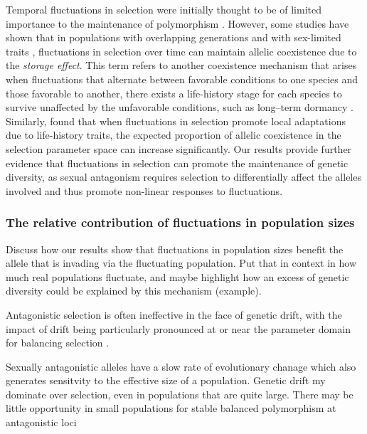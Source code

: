 \documentclass[12pt]{article}
\begin{document}
Temporal fluctuations in selection were initially thought to be of limited importance to the maintenance of polymorphism  \citep{hedrick1974genetic,hedrick1986genetic}. However, some studies have shown that in populations with overlapping generations \citep{ellner1996patterns,sasaki1995evolutionarily} and with sex-limited traits \citep{reinhold2000maintenance}, fluctuations in selection over time can maintain allelic coexistence due to the \textit{storage effect}. This term refers to another coexistence mechanism that arises when fluctuations that alternate between favorable conditions to one species and those favorable to another, there exists a life-history stage for each species to survive unaffected by the unfavorable conditions, such as long--term dormancy \citep{chesson2000general,ellner2016quantify}. Similarly, \citet{connallon2018environmental} found that when fluctuations in selection promote local adaptations due to life-history traits, the expected proportion of allelic coexistence in the selection parameter space can increase significantly. Our results provide further evidence that fluctuations in selection can promote the maintenance of genetic diversity, as sexual antagonism requires selection to differentially affect the alleles involved and thus promote non-linear responses to fluctuations.

\subsubsection*{The relative contribution of fluctuations in population sizes}

Discuss how our results show that fluctuations in population sizes benefit the allele that is invading via the fluctuating population. Put that in context in how much real populations fluctuate, and maybe highlight how an excess of genetic diversity could be explained by this mechanism (example).

Antagonistic selection is often ineffective in the face of genetic drift, with the impact of drift being particularly pronounced at or near the parameter domain for balancing selection \citep{connallon2012general}.


Sexually antagonistic alleles have a slow rate of evolutionary chanage \cite{connallon2012general} which also generates sensitvity to the effective size of a population. Genetic drift my dominate over selection, even in populations that are quite large. There may be little opportunity in small populations for stable balanced polymorphism at antagonistic loci
\end{document}

